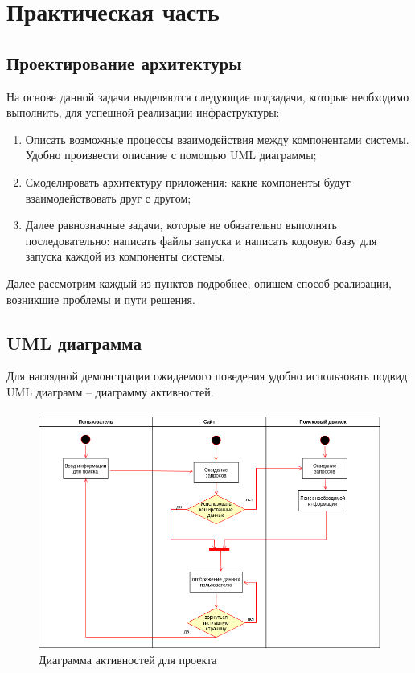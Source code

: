 \chapter{Практическая часть}
\label{cha:ch_2}

\section{Проектирование архитектуры}
На основе данной задачи выделяются следующие подзадачи, которые необходимо
выполнить, для успешной реализации инфраструктуры:
\begin{enumerate}[label=\arabic*.]
    \item Описать возможные процессы взаимодействия между компонентами системы.
        Удобно произвести описание с помощью UML диаграммы;
    \item Смоделировать архитектуру приложения: какие компоненты будут
        взаимодействовать друг с другом;
    \item Далее равнозначные задачи, которые не обязательно выполнять
        последовательно: написать файлы запуска и написать кодовую базу для
        запуска каждой из компоненты системы.
\end{enumerate}

Далее рассмотрим каждый из пунктов подробнее, опишем способ реализации,
возникшие проблемы и пути решения.

\section{UML диаграмма}
Для наглядной демонстрации ожидаемого поведения удобно использовать подвид UML диаграмм -- диаграмму активностей.
\begin{figure}[H]
    \centering
    \includegraphics[scale=0.55]{inc/img/activity_diagram.png}
    \caption{Диаграмма активностей для проекта}
\end{figure}

